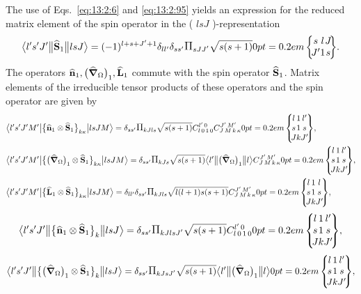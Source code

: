 The use of Eqs.~\eqref{eq:13:2:6} and \eqref{eq:13:2:95} yields an expression for the reduced matrix element of the spin operator in the ( \(l s J\) )-representation
\begin{equation}
\braOketred{ l^{\prime} s^{\prime} J^{\prime}}{\widehat{\vect{S}}_{1}}{ l s J}=(-1)^{l+s+J^{\prime}+1} \delta_{l l^{\prime}} \delta_{s s^{\prime}} \Fact{s J J^\prime}\sqrt{s(s+1)}
\sixj{s}{l}{J}{J^{\prime}}{1}{s}. \label{eq:13:2:96}
\end{equation}
The operators \(\widehat{\mathbf{n}}_{1},\bigl(\widehat{\boldsymbol{\nabla}}_{\Omega}\bigr)_{1}, \widehat{\mathbf{L}}_{1}\) commute with the spin operator \(\widehat{\mathbf{S}}_{1}\). Matrix elements of the irreducible tensor products of these operators and the spin operator are given by
\begin{align}
& 
\braOket{ l^{\prime} s^{\prime} J^{\prime} M^{\prime}}{\bigl\{\widehat{\vect{n}}_{1} \otimes \widehat{\vect{S}}_{1}\bigr\}_{k \kappa}}{l s J M}=\delta_{s s^{\prime}} \Fact{k J l s}\sqrt{ s(s+1)} 
\clebsch{l}{0}{1}{0}{l^{\prime}}{0} 
\clebsch{J}{M}{k}{\kappa}{J^{\prime}}{M^{\prime}}
\ninej{l}{1}{l^{\prime}}{s}{1}{s}{J}{k}{J^{\prime}},  \label{eq:13:2:97}\\
& 
\braOket{ l^{\prime} s^{\prime} J^{\prime} M^{\prime}}{\bigl\{\bigl(\delop_{\Omega}\bigr)_{1} \otimes \widehat{\vect{S}}_{1}\bigr\}_{k \kappa}}{l s J M}=\delta_{s s^{\prime}}\Fact{k J s} \sqrt{ s(s+1)}\braOketred{ l^{\prime}}{\bigl(\delop_{\Omega}\bigr)_{1}}{ l}
\clebsch{J}{M}{k}{\kappa}{J^{\prime}}{M^{\prime}}
\ninej{l}{1}{l^{\prime}}{s}{1}{s}{J}{k}{J^{\prime}},  \label{eq:13:2:98}\\
& 
\braOket{ l^{\prime} s^{\prime} J^{\prime} M^{\prime}}{\bigl\{\widehat{\vect{L}}_{1} \otimes \widehat{\vect{S}}_{1}\bigr\}_{k \kappa}}{l s J M}=\delta_{l l^{\prime}} \delta_{s s^{\prime}} \Fact{k J l s}\sqrt{ l(l+1) s(s+1)}
\clebsch{J}{M}{k}{\kappa}{J^{\prime}}{M^{\prime}}
\ninej{l}{1}{l}{s}{1}{s}{J}{k}{J^{\prime}}, \label{eq:13:2:99}
\end{align}
\begin{equation*}
\braOketred{ l^{\prime} s^{\prime} J^{\prime}}{\bigl\{\widehat{\vect{n}}_{1} \otimes \widehat{\vect{S}}_{1}\bigr\}_{k}}{l s J}=\delta_{s s^{\prime}} \Fact{k J l s J^{\prime}}\sqrt{ s(s+1)}
\clebsch{l}{0}{1}{0}{l^{\prime}}{0}
\ninej{l}{1}{l^{\prime}}{s}{1}{s}{J}{k}{J^{\prime}},
\end{equation*}
\begin{equation*}
\braOketred{ l^{\prime} s^{\prime} J^{\prime}}{\bigl\{\bigl(\delop_{\Omega}\bigr)_{1} \otimes \widehat{\vect{S}}_{1}\bigr\}_{k}}{l s J}=\delta_{s s^{\prime}}\Fact{k J s J^{\prime}} \sqrt{ s(s+1)}\braOketred{ l^{\prime}}{\bigl(\delop_{\Omega}\bigr)_{1}}{ l}
\ninej{l}{1}{l^{\prime}}{s}{1}{s}{J}{k}{J^{\prime}},
\end{equation*}
